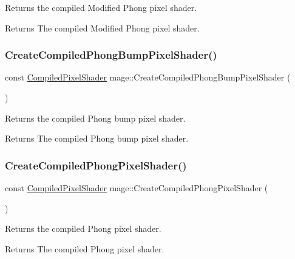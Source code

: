 Returns the compiled Modified Phong pixel shader.

\begin{DoxyReturn}{Returns}
The compiled Modified Phong pixel shader. 
\end{DoxyReturn}
\hypertarget{namespacemage_a7e48c84db917c0523c93a7bed8720d64}{}\label{namespacemage_a7e48c84db917c0523c93a7bed8720d64} 
\subsubsection{\texorpdfstring{Create\+Compiled\+Phong\+Bump\+Pixel\+Shader()}{CreateCompiledPhongBumpPixelShader()}}
{\footnotesize\ttfamily const \hyperlink{structmage_1_1_compiled_pixel_shader}{Compiled\+Pixel\+Shader} mage\+::\+Create\+Compiled\+Phong\+Bump\+Pixel\+Shader (\begin{DoxyParamCaption}{ }\end{DoxyParamCaption})}

Returns the compiled Phong bump pixel shader.

\begin{DoxyReturn}{Returns}
The compiled Phong bump pixel shader. 
\end{DoxyReturn}
\hypertarget{namespacemage_a7e79fbc943c11496ba5953b945cea257}{}\label{namespacemage_a7e79fbc943c11496ba5953b945cea257} 
\subsubsection{\texorpdfstring{Create\+Compiled\+Phong\+Pixel\+Shader()}{CreateCompiledPhongPixelShader()}}
{\footnotesize\ttfamily const \hyperlink{structmage_1_1_compiled_pixel_shader}{Compiled\+Pixel\+Shader} mage\+::\+Create\+Compiled\+Phong\+Pixel\+Shader (\begin{DoxyParamCaption}{ }\end{DoxyParamCaption})}

Returns the compiled Phong pixel shader.

\begin{DoxyReturn}{Returns}
The compiled Phong pixel shader. 
\end{DoxyReturn}
\hypertarget{namespacemage_a800fcb9d26d3f2fade19e42e3bf54724}{}\label{namespacemage_a800fcb9d26d3f2fade19e42e3bf54724} 
